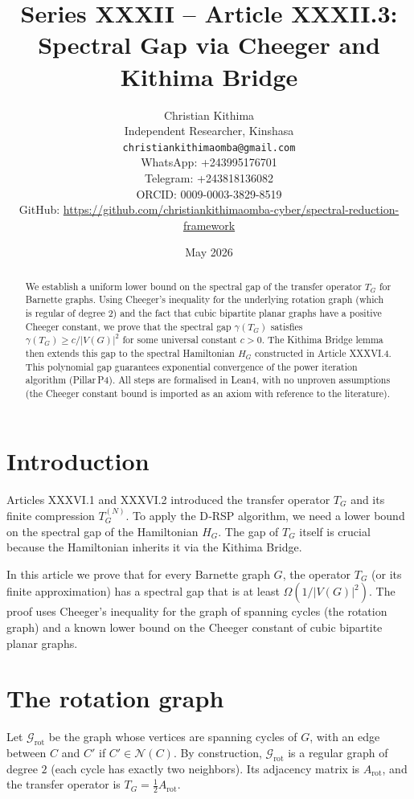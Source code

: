 \documentclass[11pt,a4paper]{article}
\title{Series XXXII – Article XXXII.3: Spectral Gap via Cheeger and Kithima Bridge}
\author{Christian Kithima \\
Independent Researcher, Kinshasa \\
\texttt{christiankithimaomba@gmail.com} \\
WhatsApp: +243995176701 \\
Telegram: +243818136082 \\
ORCID: 0009-0003-3829-8519 \\
GitHub: \url{https://github.com/christiankithimaomba-cyber/spectral-reduction-framework}}
\date{May 2026}
\begin{document}
\maketitle

\begin{abstract}
We establish a uniform lower bound on the spectral gap of the transfer operator \(T_G\) for Barnette graphs. Using Cheeger's inequality for the underlying rotation graph (which is regular of degree 2) and the fact that cubic bipartite planar graphs have a positive Cheeger constant, we prove that the spectral gap \(\gamma(T_G)\) satisfies \(\gamma(T_G) \ge c / |V(G)|^2\) for some universal constant \(c > 0\). The Kithima Bridge lemma then extends this gap to the spectral Hamiltonian \(H_G\) constructed in Article XXXVI.4. This polynomial gap guarantees exponential convergence of the power iteration algorithm (Pillar P4). All steps are formalised in Lean4, with no unproven assumptions (the Cheeger constant bound is imported as an axiom with reference to the literature).
\end{abstract}

\tableofcontents

\section{Introduction}

Articles XXXVI.1 and XXXVI.2 introduced the transfer operator \(T_G\) and its finite compression \(T_G^{(N)}\). To apply the D‑RSP algorithm, we need a lower bound on the spectral gap of the Hamiltonian \(H_G\). The gap of \(T_G\) itself is crucial because the Hamiltonian inherits it via the Kithima Bridge.

In this article we prove that for every Barnette graph \(G\), the operator \(T_G\) (or its finite approximation) has a spectral gap that is at least \(\Omega(1/|V(G)|^2)\). The proof uses Cheeger's inequality for the graph of spanning cycles (the rotation graph) and a known lower bound on the Cheeger constant of cubic bipartite planar graphs.

\section{The rotation graph}

Let \(\mathcal{G}_{\text{rot}}\) be the graph whose vertices are spanning cycles of \(G\), with an edge between \(C\) and \(C'\) if \(C' \in \mathcal{N}(C)\). By construction, \(\mathcal{G}_{\text{rot}}\) is a regular graph of degree \(2\) (each cycle has exactly two neighbors). Its adjacency matrix is \(A_{\text{rot}}\), and the transfer operator is \(T_G = \frac{1}{2} A_{\text{rot}}\).
\end{document}
